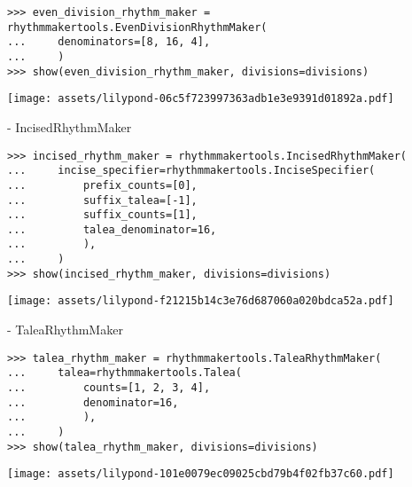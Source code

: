 \begin{singlespacing}
\begin{lstlisting}
>>> even_division_rhythm_maker = rhythmmakertools.EvenDivisionRhythmMaker(
...     denominators=[8, 16, 4],
...     )
>>> show(even_division_rhythm_maker, divisions=divisions)
\end{lstlisting}
\texttt{[image: assets/lilypond-06c5f723997363adb1e3e9391d01892a.pdf]}
\end{singlespacing}

- IncisedRhythmMaker

\begin{comment}
<abjad>
incised_rhythm_maker = rhythmmakertools.IncisedRhythmMaker(
    incise_specifier=rhythmmakertools.InciseSpecifier(
        prefix_counts=[0],
        suffix_talea=[-1],
        suffix_counts=[1],
        talea_denominator=16,
        ),
    )
show(incised_rhythm_maker, divisions=divisions)
</abjad>
\end{comment}

\begin{singlespacing}
\begin{lstlisting}
>>> incised_rhythm_maker = rhythmmakertools.IncisedRhythmMaker(
...     incise_specifier=rhythmmakertools.InciseSpecifier(
...         prefix_counts=[0],
...         suffix_talea=[-1],
...         suffix_counts=[1],
...         talea_denominator=16,
...         ),
...     )
>>> show(incised_rhythm_maker, divisions=divisions)
\end{lstlisting}
\texttt{[image: assets/lilypond-f21215b14c3e76d687060a020bdca52a.pdf]}
\end{singlespacing}

- TaleaRhythmMaker

\begin{comment}
<abjad>
talea_rhythm_maker = rhythmmakertools.TaleaRhythmMaker(
    talea=rhythmmakertools.Talea(
        counts=[1, 2, 3, 4],
        denominator=16,
        ),
    )
show(talea_rhythm_maker, divisions=divisions)
</abjad>
\end{comment}

\begin{singlespacing}
\begin{lstlisting}
>>> talea_rhythm_maker = rhythmmakertools.TaleaRhythmMaker(
...     talea=rhythmmakertools.Talea(
...         counts=[1, 2, 3, 4],
...         denominator=16,
...         ),
...     )
>>> show(talea_rhythm_maker, divisions=divisions)
\end{lstlisting}
\texttt{[image: assets/lilypond-101e0079ec09025cbd79b4f02fb37c60.pdf]}
\end{singlespacing}

